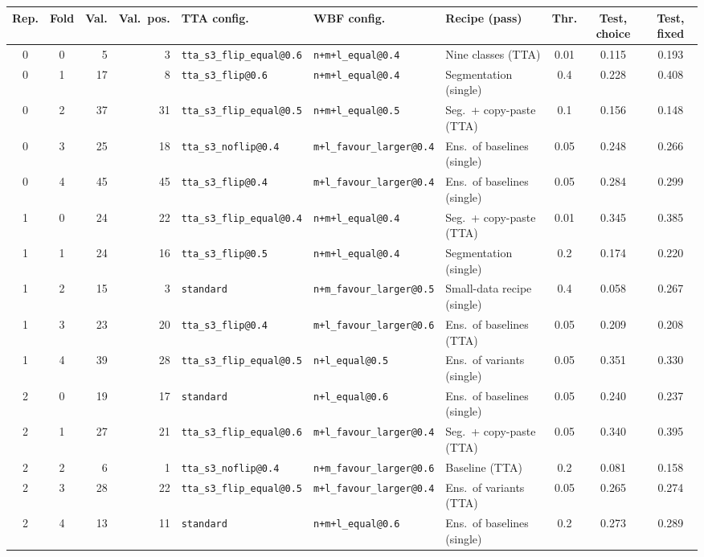 \begin{tabular}{@{} c c r r l l l c c c @{}}
\toprule
\textbf{Rep.} & \textbf{Fold} & \textbf{Val.} & \textbf{Val.\ pos.} & \textbf{TTA config.} & \textbf{WBF config.} & \textbf{Recipe (pass)} & \textbf{Thr.} & \textbf{Test, choice} & \textbf{Test, fixed} \\
\midrule
0 & 0 & 5 & 3 & \texttt{tta\_s3\_flip\_equal@0.6} & \texttt{n+m+l\_equal@0.4} & Nine classes (TTA) & 0.01 & 0.115 & 0.193 \\
0 & 1 & 17 & 8 & \texttt{tta\_s3\_flip@0.6} & \texttt{n+m+l\_equal@0.4} & Segmentation (single) & 0.4 & 0.228 & 0.408 \\
0 & 2 & 37 & 31 & \texttt{tta\_s3\_flip\_equal@0.5} & \texttt{n+m+l\_equal@0.5} & Seg.\ + copy-paste (TTA) & 0.1 & 0.156 & 0.148 \\
0 & 3 & 25 & 18 & \texttt{tta\_s3\_noflip@0.4} & \texttt{m+l\_favour\_larger@0.4} & Ens.\ of baselines (single) & 0.05 & 0.248 & 0.266 \\
0 & 4 & 45 & 45 & \texttt{tta\_s3\_flip@0.4} & \texttt{m+l\_favour\_larger@0.4} & Ens.\ of baselines (single) & 0.05 & 0.284 & 0.299 \\
1 & 0 & 24 & 22 & \texttt{tta\_s3\_flip\_equal@0.4} & \texttt{n+m+l\_equal@0.4} & Seg.\ + copy-paste (TTA) & 0.01 & 0.345 & 0.385 \\
1 & 1 & 24 & 16 & \texttt{tta\_s3\_flip@0.5} & \texttt{n+m+l\_equal@0.4} & Segmentation (single) & 0.2 & 0.174 & 0.220 \\
1 & 2 & 15 & 3 & \texttt{standard} & \texttt{n+m\_favour\_larger@0.5} & Small-data recipe (single) & 0.4 & 0.058 & 0.267 \\
1 & 3 & 23 & 20 & \texttt{tta\_s3\_flip@0.4} & \texttt{m+l\_favour\_larger@0.6} & Ens.\ of baselines (TTA) & 0.05 & 0.209 & 0.208 \\
1 & 4 & 39 & 28 & \texttt{tta\_s3\_flip\_equal@0.5} & \texttt{n+l\_equal@0.5} & Ens.\ of variants (single) & 0.05 & 0.351 & 0.330 \\
2 & 0 & 19 & 17 & \texttt{standard} & \texttt{n+l\_equal@0.6} & Ens.\ of baselines (single) & 0.05 & 0.240 & 0.237 \\
2 & 1 & 27 & 21 & \texttt{tta\_s3\_flip\_equal@0.6} & \texttt{m+l\_favour\_larger@0.4} & Seg.\ + copy-paste (TTA) & 0.05 & 0.340 & 0.395 \\
2 & 2 & 6 & 1 & \texttt{tta\_s3\_noflip@0.4} & \texttt{n+m\_favour\_larger@0.6} & Baseline (TTA) & 0.2 & 0.081 & 0.158 \\
2 & 3 & 28 & 22 & \texttt{tta\_s3\_flip\_equal@0.5} & \texttt{m+l\_favour\_larger@0.4} & Ens.\ of variants (TTA) & 0.05 & 0.265 & 0.274 \\
2 & 4 & 13 & 11 & \texttt{standard} & \texttt{n+m+l\_equal@0.6} & Ens.\ of baselines (single) & 0.2 & 0.273 & 0.289 \\
\bottomrule
\end{tabular}
